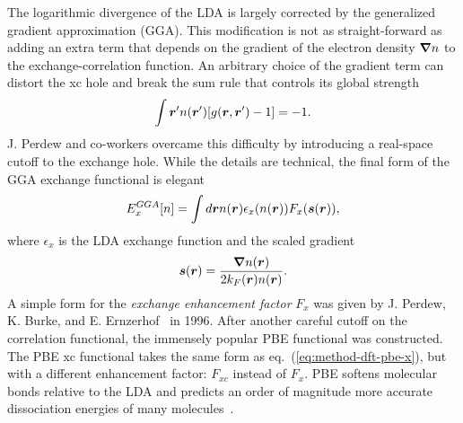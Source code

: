 The logarithmic divergence of the LDA is largely corrected by the generalized gradient approximation (GGA). This modification is not as straight-forward as adding an extra term that depends on the gradient of the electron density $\boldsymbol{\nabla}n$ to the exchange-correlation function. An arbitrary choice of the gradient term can distort the xc hole and break the sum rule that controls its global strength
\begin{align}
\int\boldsymbol{r}' n(\boldsymbol{r}')[g(\boldsymbol{r},\boldsymbol{r}')-1] = -1.
\end{align}
J. Perdew and co-workers overcame this difficulty by introducing a real-space cutoff to the exchange hole. While the details are technical, the final form of the GGA exchange functional is elegant
\begin{align} \label{eq:method-dft-pbe-x}
E_x^{GGA}[n] = \int d\boldsymbol{r} n(\boldsymbol{r})\epsilon_x(n(\boldsymbol{r}))F_x(\boldsymbol{s}(\boldsymbol{r})),
\end{align}
where $\epsilon_x$ is the LDA exchange function and the scaled gradient
\begin{align}
\boldsymbol{s}(\boldsymbol{r}) = \dfrac{\boldsymbol{\nabla}n(\boldsymbol{r})}{2k_F(\boldsymbol{r})n(\boldsymbol{r})}.
\end{align}
A simple form for the \emph{exchange enhancement factor} $F_x$ was given by J. Perdew, K. Burke, and E. Ernzerhof~\cite{Perdew1996} in 1996. After another careful cutoff on the correlation functional, the immensely popular PBE functional was constructed. The PBE xc functional takes the same form as eq.~(\ref{eq:method-dft-pbe-x}), but with a different enhancement factor: $F_{xc}$ instead of $F_x$.
PBE softens molecular bonds relative to the LDA and predicts an order of magnitude more accurate dissociation energies of many molecules~\cite{Perdew1996}.

